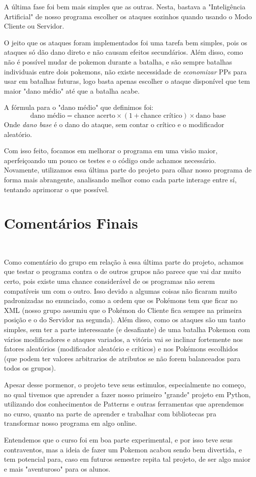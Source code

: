 \documentclass[a4paper]{article}
\begin{document}
A última fase foi bem mais simples que as outras. Nesta, bastava a "Inteligência Artificial"
de nosso programa escolher os ataques sozinhos quando usando o Modo Cliente ou Servidor.

O jeito que os ataques foram implementados foi uma tarefa bem simples, pois os ataques só dão
dano direto e não causam efeitos secundários. Além disso, como não é possível mudar de pokemon
durante a batalha, e são sempre batalhas individuais entre dois pokemons, não existe necessidade
de \emph{economizar} PPs para usar em batalhas futuras, logo basta apenas escolher o ataque
disponível que tem maior "dano médio" até que a batalha acabe.

A fórmula para o "dano médio" que definimos foi:
$$ \text{dano médio} = \text{chance acerto} \times (1 + \text{chance crítico}) \times \text{dano base} $$
Onde \emph{dano base} é o dano do ataque, sem contar o crítico e o modificador aleatório.

Com isso feito, focamos em melhorar o programa em uma visão maior, aperfeiçoando um pouco
os testes e o código onde achamos necessário. Novamente, utilizamos essa última parte do
projeto para olhar nosso programa de forma mais abrangente, analisando melhor como cada parte
interage entre sí, tentando aprimorar o que possível.

\newpage
\section{Comentários Finais}

\begin{verbatim}


\end{verbatim}

Como comentário do grupo em relação à essa última parte do projeto, achamos que testar o programa
contra o de outros grupos não parece que vai dar muito certo, pois existe uma chance considerável
de os programas não serem compatíveis um com o outro. Isso devido a algumas coisas não ficaram muito
padronizadas no enunciado, como a ordem que os Pokémons tem que ficar no XML (nosso grupo assumiu
que o Pokémon do Cliente fica sempre na primeira posição e o do Servidor na segunda).
Além disso, como os ataques são um tanto simples, sem ter a parte interessante (e desafiante) de uma
batalha Pokemon com vários modificadores e ataques variados, a vitória vai se inclinar fortemente
nos fatores aleatórios (modificador aleatório e críticos) e nos Pokémons escolhidos (que podem
ter valores arbitrarios de atributos se não forem balanceados para todos os grupos).

Apesar desse pormenor, o projeto teve seus estimulos, especialmente no começo, no qual tivemos que
aprender a fazer nosso primeiro "grande" projeto em Python, utilizando dos conhecimentos de Patterns
e outras ferramentas que aprendemos no curso, quanto na parte de aprender e trabalhar com bibliotecas
pra transformar nosso programa em algo online.

Entendemos que o curso foi em boa parte experimental, e por isso teve seus contraventos, mas a ideia
de fazer um Pokemon acabou sendo bem divertida, e tem potencial para, caso em futuros semestre repita
tal projeto, de ser algo maior e mais "aventuroso" para os alunos. 
\end{document}
